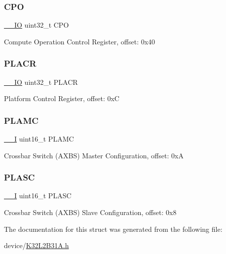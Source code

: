 \subsubsection{\texorpdfstring{CPO}{CPO}}
{\footnotesize\ttfamily \mbox{\hyperlink{core__cm0plus_8h_aec43007d9998a0a0e01faede4133d6be}{\+\_\+\+\_\+\+IO}} uint32\+\_\+t C\+PO}

Compute Operation Control Register, offset\+: 0x40 \mbox{\label{struct_m_c_m___type_a16512ce9ebeba1cd4b36259b4872b679}} 
\subsubsection{\texorpdfstring{PLACR}{PLACR}}
{\footnotesize\ttfamily \mbox{\hyperlink{core__cm0plus_8h_aec43007d9998a0a0e01faede4133d6be}{\+\_\+\+\_\+\+IO}} uint32\+\_\+t P\+L\+A\+CR}

Platform Control Register, offset\+: 0xC \mbox{\label{struct_m_c_m___type_a951da47dda3dfe3452e96e494178fad4}} 
\subsubsection{\texorpdfstring{PLAMC}{PLAMC}}
{\footnotesize\ttfamily \mbox{\hyperlink{core__cm0plus_8h_af63697ed9952cc71e1225efe205f6cd3}{\+\_\+\+\_\+I}} uint16\+\_\+t P\+L\+A\+MC}

Crossbar Switch (A\+X\+BS) Master Configuration, offset\+: 0xA \mbox{\label{struct_m_c_m___type_a59d6723930c0cbfd56a7451ec569b598}} 
\subsubsection{\texorpdfstring{PLASC}{PLASC}}
{\footnotesize\ttfamily \mbox{\hyperlink{core__cm0plus_8h_af63697ed9952cc71e1225efe205f6cd3}{\+\_\+\+\_\+I}} uint16\+\_\+t P\+L\+A\+SC}

Crossbar Switch (A\+X\+BS) Slave Configuration, offset\+: 0x8 

The documentation for this struct was generated from the following file\+:\begin{DoxyCompactItemize}
\item 
device/\mbox{\hyperlink{_k32_l2_b31_a_8h}{K32\+L2\+B31\+A.\+h}}\end{DoxyCompactItemize}
